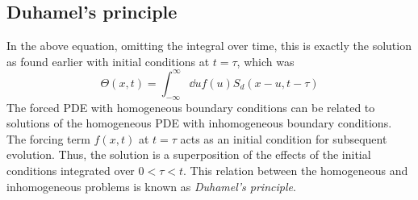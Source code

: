 \documentclass[a4paper]{article}
\begin{document}
\subsection{Duhamel's principle}
In the above equation, omitting the integral over time, this is exactly the solution as found earlier with initial conditions at \( t = \tau \), which was
\[
	\Theta(x,t) = \int_{-\infty}^\infty \dd{u} f(u) S_d(x-u, t-\tau)
\]
The forced PDE with homogeneous boundary conditions can be related to solutions of the homogeneous PDE with inhomogeneous boundary conditions.
The forcing term \( f(x,t) \) at \( t = \tau \) acts as an initial condition for subsequent evolution.
Thus, the solution is a superposition of the effects of the initial conditions integrated over \( 0 < \tau < t \).
This relation between the homogeneous and inhomogeneous problems is known as \textit{Duhamel's principle}.
\end{document}
